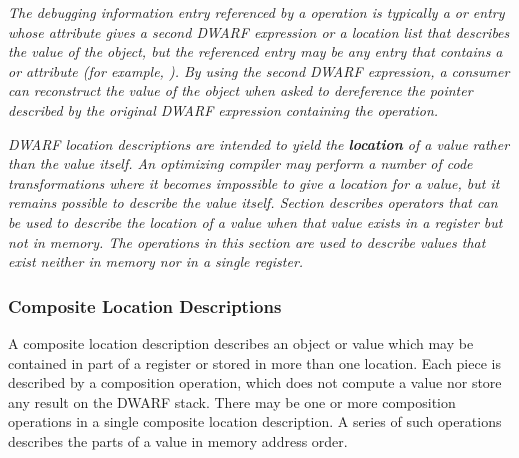 \begin{enumerate}[1. ]
\textit{The debugging information entry referenced by a 
\DWOPimplicitpointerNAME{} operation is typically a
\DWTAGvariable{} or \DWTAGformalparameter{} entry whose
\DWATlocation{} attribute gives a second DWARF expression or a
location list that describes the value of the object, but the
referenced entry may be any entry that contains a \DWATlocation{}
or \DWATconstvalue{} attribute (for example, \DWTAGdwarfprocedure).
By using the second DWARF expression, a consumer can
reconstruct the value of the object when asked to dereference
the pointer described by the original DWARF expression
containing the \DWOPimplicitpointer{} operation.}

\end{enumerate}

\textit{DWARF location descriptions 
are intended to yield the \textbf{location}
of a value rather than the value itself. An optimizing compiler
may perform a number of code transformations where it becomes
impossible to give a location for a value, but it remains possible
to describe the value itself. 
Section 
describes operators that can be used to
describe the location of a value when that value exists in a
register but not in memory. The operations in this section are
used to describe values that exist neither in memory nor in a
single register.}
 

\subsubsection{Composite Location Descriptions}
A composite location description describes an object or
value which may be contained in part of a register or stored
in more than one location. Each piece is described by a
composition operation, which does not compute a value nor
store any result on the DWARF stack. There may be one or
more composition operations in a single composite location
description. A series of such operations describes the parts
of a value in memory address order.

